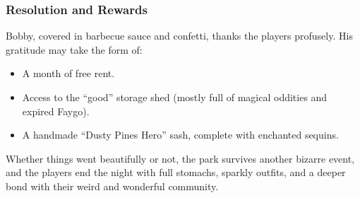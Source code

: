 \subsubsection{Resolution and Rewards}

Bobby, covered in barbecue sauce and confetti, thanks the players profusely. His gratitude may take the form of:
\begin{itemize}
    \item A month of free rent.
    \item Access to the “good” storage shed (mostly full of magical oddities and expired Faygo).
    \item A handmade “Dusty Pines Hero” sash, complete with enchanted sequins.
\end{itemize}

Whether things went beautifully or not, the park survives another bizarre event, and the players end the night with full stomachs, sparkly outfits, and a deeper bond with their weird and wonderful community.



